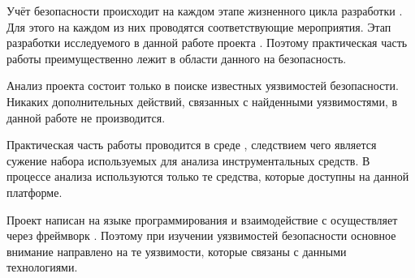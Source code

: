 %
Учёт безопасности происходит на каждом этапе жизненного цикла разработки  . 
%
Для этого на каждом из них проводятся соответствующие мероприятия. 
%
Этап разработки исследуемого в данной работе проекта   . 
%
Поэтому практическая часть работы преимущественно лежит в области  данного  на безопасность.

%
Анализ проекта  состоит только в поиске известных уязвимостей безопасности.
%
Никаких дополнительных действий, связанных с найденными уязвимостями, в данной работе не производится.

%
Практическая часть работы проводится в среде  , следствием чего является сужение набора используемых для анализа инструментальных средств.
%
В процессе анализа используются только те средства, которые доступны на данной платформе.

%
Проект  написан на языке программирования   и взаимодействие с  осуществляет через фреймворк  .
%
Поэтому при изучении уязвимостей безопасности  основное внимание направлено на те уязвимости, которые связаны с данными технологиями.